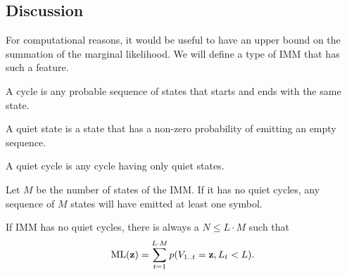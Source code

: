 
\subsection{Discussion}

For computational reasons, it would be useful to have an upper bound on the summation of the
marginal likelihood.
We will define a type of IMM that has such a feature.

\begin{definition}
  A cycle is any probable sequence of states that starts and ends with the same state.
\end{definition}

\begin{definition}
  A quiet state is a state that has a non-zero probability of emitting an empty sequence.
\end{definition}

\begin{definition}
  A quiet cycle is any cycle having only quiet states.
\end{definition}

\begin{corollary}
  Let $M$ be the number of states of the IMM. If it has no quiet cycles, any sequence of $M$ states
  will have emitted at least one symbol.
\end{corollary}

If IMM has no quiet cycles, there is always a $N \leq L\cdot M$ such that
\begin{align*}
  \mathrm{ML}(\mathbf{z}) = \sum_{t=1}^{L\cdot M} p(V_{1..t}=\mathbf{z}, L_t<L).
\end{align*}
